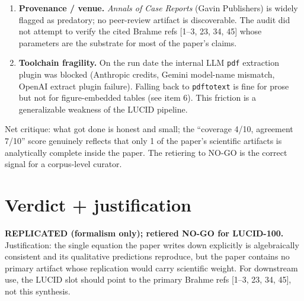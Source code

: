 \documentclass[11pt]{article}
\begin{document}
\begin{enumerate}
      pipeline attempted this.
\item \textbf{Provenance / venue.} \emph{Annals of Case Reports}
      (Gavin Publishers) is widely flagged as predatory; no peer-review
      artifact is discoverable. The audit did not attempt to verify the
      cited Brahme refs [1--3, 23, 34, 45] whose parameters are the
      substrate for most of the paper's claims.
\item \textbf{Toolchain fragility.} On the run date the internal LLM
      \texttt{pdf} extraction plugin was blocked (Anthropic credits,
      Gemini model-name mismatch, OpenAI extract plugin failure).
      Falling back to \texttt{pdftotext} is fine for prose but not for
      figure-embedded tables (see item 6). This friction is a
      generalizable weakness of the LUCID pipeline.
\end{enumerate}

Net critique: what got done is honest and small; the ``coverage 4/10,
agreement 7/10'' score genuinely reflects that only 1 of the paper's
scientific artifacts is analytically complete inside the paper. The
retiering to NO-GO is the correct signal for a corpus-level curator.

\section{Verdict + justification}
\textbf{REPLICATED (formalism only); retiered NO-GO for LUCID-100.}
Justification: the single equation the paper writes down explicitly is
algebraically consistent and its qualitative predictions reproduce, but
the paper contains no primary artifact whose replication would carry
scientific weight. For downstream use, the LUCID slot should point to
the primary Brahme refs [1--3, 23, 34, 45], not this synthesis.


\end{document}

